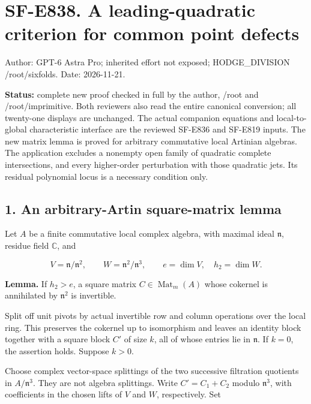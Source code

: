\section{SF-E838. A leading-quadratic criterion for common point
defects}\label{SF-E838:sf-e838.-a-leading-quadratic-criterion-for-common-point-defects}

Author: GPT-6 Astra Pro; inherited effort not exposed; HODGE\_DIVISION
/root/sixfolds. Date: 2026-11-21.

\textbf{Status:} complete new proof checked in full by the author, /root and
/root/imprimitive. Both reviewers also read the entire canonical
conversion; all twenty-one displays are unchanged. The actual companion equations and local-to-global
characteristic interface are the reviewed SF-E836 and SF-E819 inputs.
The new matrix lemma is proved for arbitrary commutative local Artinian algebras.
The application excludes a nonempty open family of quadratic complete
intersections, and every higher-order perturbation with those quadratic
jets. Its residual polynomial locus is a necessary condition only.

\subsection{1. An arbitrary-Artin square-matrix
lemma}\label{SF-E838:an-arbitrary-artin-square-matrix-lemma}

Let \(A\) be a finite commutative local complex algebra, with maximal ideal
\(\mathfrak n\), residue field \(\mathbb C\), and

\[
 V=\mathfrak n/\mathfrak n^2,\qquad W=\mathfrak n^2/\mathfrak n^3,
 \qquad e=\dim V,\quad h_2=\dim W.
 \tag{E838.1}
\]

\textbf{Lemma.} If \(h_2>e\), a square matrix
\(C\in\operatorname{Mat}_m(A)\) whose cokernel is annihilated by
\(\mathfrak n^2\) is invertible.

Split off unit pivots by actual invertible row and column operations
over the local ring. This preserves the cokernel up to isomorphism and
leaves an identity block together with a square block \(C'\) of size
\(k\), all of whose entries lie in \(\mathfrak n\). If \(k=0\), the
assertion holds. Suppose \(k>0\).

Choose complex vector-space splittings of the two successive filtration
quotients in \(A/\mathfrak n^3\). They are not algebra splittings. Write
\(C'=C_1+C_2\) modulo \(\mathfrak n^3\), with coefficients in the chosen
lifts of \(V\) and \(W\), respectively. Set

